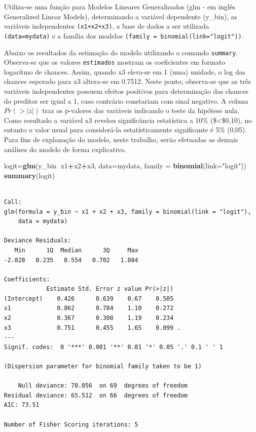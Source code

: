 \documentclass[12pt,brazil,oneside]{book}
\newenvironment{Shaded}{\begin{snugshade}}{\end{snugshade}}
\newcommand{\DataTypeTok}[1]{\textcolor[rgb]{0.13,0.29,0.53}{#1}}
\newcommand{\KeywordTok}[1]{\textcolor[rgb]{0.13,0.29,0.53}{\textbf{#1}}}
\newcommand{\NormalTok}[1]{#1}
\newcommand{\OperatorTok}[1]{\textcolor[rgb]{0.81,0.36,0.00}{\textbf{#1}}}
\newcommand{\StringTok}[1]{\textcolor[rgb]{0.31,0.60,0.02}{#1}}
\begin{document}
Utiliza-se uma função para Modelos Lineares Generalizados (glm - em inglês Generalized Linear Models), determinando a variável dependente (y\_bin), as variáveis independentes \texttt{(x1+x2+x3)}, a base de dados a ser utilizada \texttt{(data=mydata)} e a família dos modelos \texttt{(family\ =\ binomial(link="logit"))}.

Abaixo os resultados da estimação do modelo utilizando o comando \texttt{summary}. Observa-se que os valores \texttt{estimados} mostram os coeficientes em formato logarítmo de chances. Assim, quando x3 eleva-se em 1 (uma) unidade, o log das chances esperado para x3 altera-se em 0,7512. Neste ponto, observa-se que as três variáveis independentes possuem efeitos positivos para determinação das chances do preditor ser igual a 1, caso contrário constariam com sinal negativo. A coluna \(Pr(>|z|)\) traz os p-valores das variáveis indicando o teste da hipótese nula. Como resultado a variável x3 revelou significância estatística a 10\% (\$\textless{}\$0,10), no entanto o valor usual para considerá-la estatísticamente significante é 5\% (0,05). Para fins de explanação do modelo, neste trabalho, serão efetuadas as demais análises do modelo de forma explicativa.

\begin{Shaded}
\begin{Highlighting}[]
\NormalTok{logit=}\KeywordTok{glm}\NormalTok{(y_bin}\OperatorTok{~}\NormalTok{x1}\OperatorTok{+}\NormalTok{x2}\OperatorTok{+}\NormalTok{x3, }\DataTypeTok{data=}\NormalTok{mydata, }\DataTypeTok{family =} \KeywordTok{binomial}\NormalTok{(}\DataTypeTok{link=}\StringTok{"logit"}\NormalTok{))}
\KeywordTok{summary}\NormalTok{(logit)}
\end{Highlighting}
\end{Shaded}

\begin{verbatim}

Call:
glm(formula = y_bin ~ x1 + x2 + x3, family = binomial(link = "logit"), 
    data = mydata)

Deviance Residuals: 
   Min      1Q  Median      3Q     Max  
-2.028   0.235   0.554   0.702   1.084  

Coefficients:
            Estimate Std. Error z value Pr(>|z|)  
(Intercept)    0.426      0.639    0.67    0.505  
x1             0.862      0.784    1.10    0.272  
x2             0.367      0.308    1.19    0.234  
x3             0.751      0.455    1.65    0.099 .
---
Signif. codes:  0 '***' 0.001 '**' 0.01 '*' 0.05 '.' 0.1 ' ' 1

(Dispersion parameter for binomial family taken to be 1)

    Null deviance: 70.056  on 69  degrees of freedom
Residual deviance: 65.512  on 66  degrees of freedom
AIC: 73.51

Number of Fisher Scoring iterations: 5
\end{verbatim}
\end{document}

